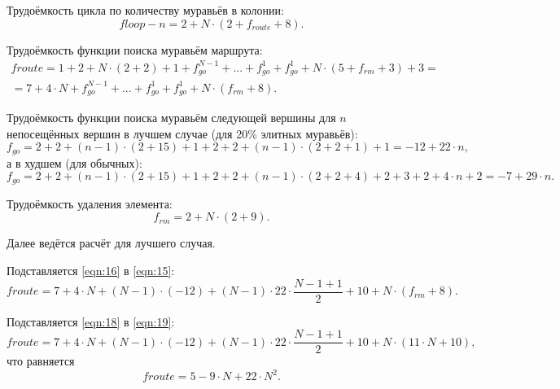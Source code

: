 Трудоёмкость цикла по количеству муравьёв в колонии:
\begin{equation}\label{eqn:14}
	f{loop-n} = 2 + N \cdot (2 + f_{route} + 8).
\end{equation}

Трудоёмкость функции поиска муравьём маршрута:
\begin{equation}\label{eqn:15}
\begin{aligned}
	f{route} = 1 + 2 + N \cdot (2 + 2) + 1 + f_{go}^{N - 1} + ... + f_{go}^{1} + f_{go}^{1} + N \cdot (5 + f_{rm} + 3) + 3 = \\ = 7 + 4 \cdot N + f_{go}^{N - 1} + ... + f_{go}^{1} + f_{go}^{1} + N \cdot (f_{rm} + 8).
\end{aligned}
\end{equation}

Трудоёмкость функции поиска муравьём следующей вершины для $n$ непосещённых вершин в лучшем случае (для 20\% элитных муравьёв):
\begin{equation} \label{eqn:16}
	f_{go} = 2 + 2 + (n - 1) \cdot (2 + 15) + 1 + 2 + 2 + (n - 1) \cdot (2 + 2 + 1) + 1 = -12 + 22 \cdot n,
\end{equation}
а в худшем (для обычных):
\begin{equation}\label{eqn:17}
	f_{go} = 2 + 2 + (n - 1) \cdot (2 + 15) + 1 + 2 + 2 + (n - 1) \cdot (2 + 2 + 4) + 2 + 3 + 2 + 4 \cdot n + 2 = -7 + 29 \cdot n.
\end{equation}

Трудоёмкость удаления элемента:
\begin{equation}\label{eqn:18}
	f_{rm} = 2 + N \cdot (2 + 9).
\end{equation}

Далее ведётся расчёт для лучшего случая.

Подставляется \ref{eqn:16} в \ref{eqn:15}:
\begin{equation} \label{eqn:19}
	f{route} = 7 + 4 \cdot N + (N-1) \cdot (-12) + (N-1) \cdot 22 \cdot \frac{N - 1 + 1}{2} + 10 + N \cdot (f_{rm} + 8).
\end{equation}

Подставляется \ref{eqn:18} в \ref{eqn:19}:
\begin{equation}
	f{route} = 7 + 4 \cdot N + (N-1) \cdot (-12) + (N-1) \cdot 22 \cdot \frac{N - 1 + 1}{2} + 10 + N \cdot (11 \cdot N + 10),
\end{equation}
что равняется 
\begin{equation}
	f{route} = 5 - 9 \cdot N + 22 \cdot N^2. 
\end{equation}

